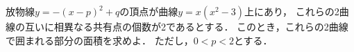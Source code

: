 \documentclass[../../main.tex]{subfiles}
\begin{document}
放物線$y=-{(x-p)}^2+q$の頂点が曲線$y=x(x^2-3)$上にあり，
これらの2曲線の互いに相異なる共有点の個数が2であるとする．
このとき，これらの2曲線で囲まれる部分の面積を求めよ．
ただし，$0<p<2$とする．
\end{document}
